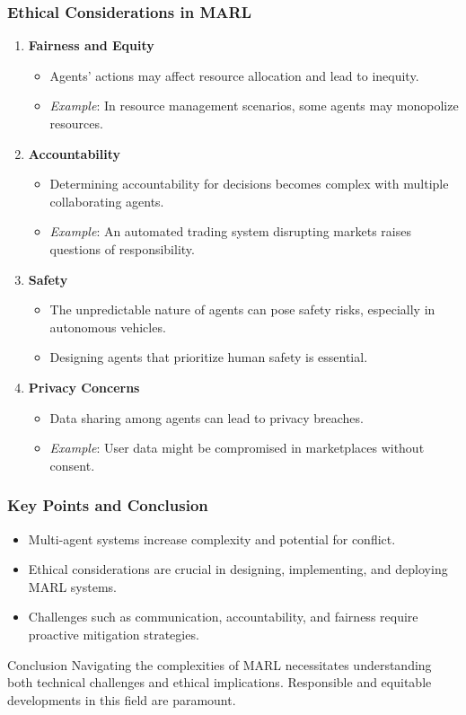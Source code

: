 \documentclass[aspectratio=169]{beamer}
\begin{document}
\begin{frame}[fragile]
  \frametitle{Ethical Considerations in MARL}
  \begin{enumerate}
    \item \textbf{Fairness and Equity}
      \begin{itemize}
        \item Agents' actions may affect resource allocation and lead to inequity.
        \item \textit{Example}: In resource management scenarios, some agents may monopolize resources.
      \end{itemize}

    \item \textbf{Accountability}
      \begin{itemize}
        \item Determining accountability for decisions becomes complex with multiple collaborating agents.
        \item \textit{Example}: An automated trading system disrupting markets raises questions of responsibility.
      \end{itemize}

    \item \textbf{Safety}
      \begin{itemize}
        \item The unpredictable nature of agents can pose safety risks, especially in autonomous vehicles.
        \item Designing agents that prioritize human safety is essential.
      \end{itemize}

    \item \textbf{Privacy Concerns}
      \begin{itemize}
        \item Data sharing among agents can lead to privacy breaches.
        \item \textit{Example}: User data might be compromised in marketplaces without consent.
      \end{itemize}
  \end{enumerate}
\end{frame}

\begin{frame}[fragile]
  \frametitle{Key Points and Conclusion}
  \begin{itemize}
    \item Multi-agent systems increase complexity and potential for conflict.
    \item Ethical considerations are crucial in designing, implementing, and deploying MARL systems.
    \item Challenges such as communication, accountability, and fairness require proactive mitigation strategies.
  \end{itemize}

  \begin{block}{Conclusion}
    Navigating the complexities of MARL necessitates understanding both technical challenges and ethical implications.
    Responsible and equitable developments in this field are paramount.
  \end{block}
\end{frame}
\end{document}
